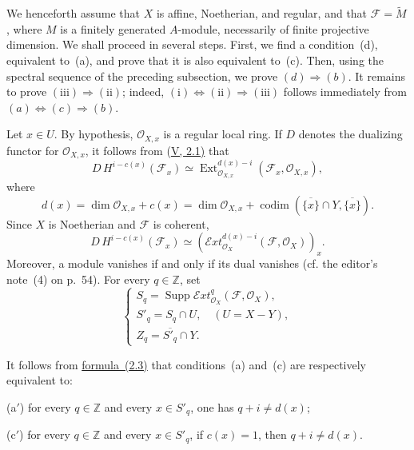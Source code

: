 \documentclass[11pt,a4paper,oneside]{book}
\providecommand{\sExt}{\mathcal E\!xt}
\providecommand{\cF}{\mathcal F}
\providecommand{\cO}{\mathcal O}
\providecommand{\Supp}{\operatorname{Supp}}
\providecommand{\codim}{\operatorname{codim}}
\theoremstyle{plain}
\theoremstyle{definition}
\theoremstyle{remark}
\begin{document}
\medskip
We henceforth assume that $X$ is affine, Noetherian, and regular, and that
$\cF=\widetilde M$, where $M$ is a finitely generated $A$-module, necessarily
of finite projective dimension. We shall proceed in several steps. First, we
find a condition~(d), equivalent to~(a), and prove that it is also equivalent
to~(c). Then, using the spectral sequence of the preceding subsection, we
prove $(d)\Rightarrow(b)$. It remains to prove
$(\mathrm{iii})\Rightarrow(\mathrm{ii})$; indeed,
$(\mathrm{i})\Leftrightarrow(\mathrm{ii})\Rightarrow(\mathrm{iii})$ follows
immediately from $(a)\Leftrightarrow(c)\Rightarrow(b)$.

Let $x\in U$. By hypothesis, $\cO_{X,x}$ is a regular local ring. If $D$
denotes the dualizing functor for $\cO_{X,x}$, it follows from (\hyperref[V.2.1]{V, 2.1)} that
\[
  D\,H^{i-c(x)}(\cF_x)\simeq
  \operatorname{Ext}^{d(x)-i}_{\cO_{X,x}}(\cF_x,\cO_{X,x}),
\]
where
\begin{equation}\label{eq:VIII.2.2}
  d(x)=\dim\cO_{X,x}+c(x)
      =\dim\cO_{X,x}
       +\codim(\overline{\{x\}}\cap Y,\overline{\{x\}}).
  \tag{2.2}
\end{equation}
Since $X$ is Noetherian and $\cF$ is coherent,
\begin{equation}\label{eq:VIII.2.3}
  D\,H^{i-c(x)}(\cF_x)\simeq
  (\sExt^{d(x)-i}_{\cO_X}(\cF,\cO_X))_x.
  \tag{2.3}
\end{equation}
Moreover, a module vanishes if and only if its dual vanishes (cf. the
editor's note~(4) on p.~54). For every $q\in\mathbb Z$, set
\begin{equation}\label{eq:VIII.2.4}
  \begin{cases}
    S_q=\Supp\sExt^q_{\cO_X}(\cF,\cO_X),\\
    S'_q=S_q\cap U,\quad (U=X-Y),\\
    Z_q=\overline{S'_q}\cap Y.
  \end{cases}
  \tag{2.4}
\end{equation}

\medskip
It follows from \hyperref[eq:VIII.2.3]{formula~(2.3)} that conditions~(a) and~(c) are respectively
equivalent to:

\medskip
\noindent\textup{(a$'$)} for every $q\in\mathbb Z$ and every $x\in S'_q$,
one has $q+i\ne d(x)$;

\smallskip
\noindent\textup{(c$'$)} for every $q\in\mathbb Z$ and every $x\in S'_q$,
if $c(x)=1$, then $q+i\ne d(x)$.
\end{document}
